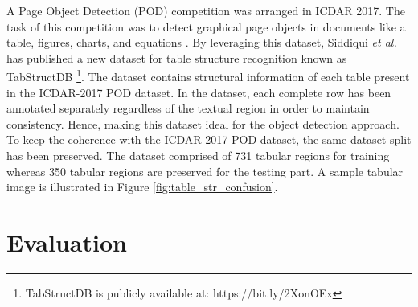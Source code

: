 \documentclass{ieeeaccess}
\begin{document}
A Page Object Detection (POD) competition was arranged in ICDAR 2017. The task of this competition was to detect graphical page objects in documents like a table, figures, charts, and equations \cite{b55}. By leveraging this dataset, Siddiqui \textit{et al.} \cite{b32} has published a new dataset for table structure recognition known as TabStructDB \footnote{TabStructDB is publicly available at: https://bit.ly/2XonOEx}. The dataset contains structural information of each table present in the ICDAR-2017 POD dataset. In the dataset, each complete row has been annotated separately regardless of the textual region in order to maintain consistency. Hence, making this dataset ideal for the object detection approach.  To keep the coherence with the ICDAR-2017 POD dataset, the same dataset split has been preserved. The dataset comprised of 731 tabular regions for training whereas 350 tabular regions are preserved for the testing part. A sample tabular image is illustrated in Figure \ref{fig:table_str_confusion}.










\section{Evaluation}
\label{sec:evaluation} 







\end{document}
